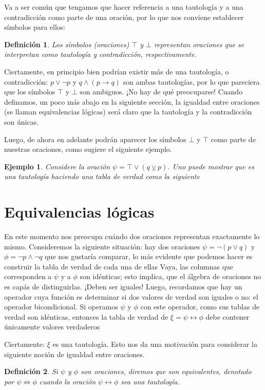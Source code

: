 \documentclass{book}
\newtheorem{df}{Definición}[chapter]
\newtheorem*{ejm}{Ejemplo}
\begin{document}
Va a ser común que tengamos que hacer referencia a una tautología y a una contradicción como parte de una oración, por lo que nos conviene establecer símbolos para ellos:
\begin{df}
	Los símbolos (oraciones) $\top$ y $\bot$ representan oraciones que se interpretan como tautología y contradicción, respectivamente.
\end{df}
Ciertamente, en principio bien podrían existir más de una tautología, o contradicción: $p\vee \neg p$ y $q \wedge (p \rightarrow q)$ son ambas tautologías, por lo que pareciera que los símbolos $\top$ y $\bot$ son ambiguos.
¡No hay de qué preocuparse! Cuando definamos, un poco más abajo en la siguiente sección, la igualdad entre oraciones (se llaman equivalencias lógicas) será claro que la tautología y la contradicción son únicas. %

Luego, de ahora en adelante podrán aparecer los símbolos $\bot$ y $\top$ como parte de nuestras oraciones, como sugiere el siguiente ejemplo.

\begin{ejm}
	Considere la oración $\psi = \top \vee (q \veebar p)$. Uno puede mostrar que es una tautología haciendo una tabla de verdad como la siguiente %
\end{ejm}

\section{Equivalencias lógicas}
En este momento nos preocupa cuándo dos oraciones representan exactamente lo mismo.
Consideremos la siguiente situación: hay dos oraciones $\psi =\neg (p \vee q)$ y $\phi = \neg p \wedge \neg q$ que nos gustaría comparar, lo más evidente que podemos hacer es construir la tabla de verdad de cada una de ellas %
Vaya, las columnas que corresponden a $\psi$ y a $\phi$ son idénticas; esto implica, que el álgebra de oraciones no es capás de distinguirlas. ¡Deben ser iguales!
Luego, recordamos que hay un operador cuya función es determinar si dos valores de verdad son iguales o no: el operador bicondicional.
Si operamos $\psi$ y $\phi$ con este operador, como sus tablas de verdad son idénticas, entonces la tabla de verdad de $\xi = \psi \leftrightarrow \phi$ debe contener únicamente valores verdaderos %

Ciertamente: $\xi$ es una tautología. Esto nos da una motivación para considerar la siguiente noción de igualdad entre oraciones.
\begin{df}\label{df_equivalenciaLogica}
	Si $\psi$ y $\phi$ son oraciones, diremos que son \emph{equivalentes}, denotado por $\psi \iff \phi$ cuando la oración $\psi \leftrightarrow \phi$ sea una tautología.
\end{df}
\end{document}
